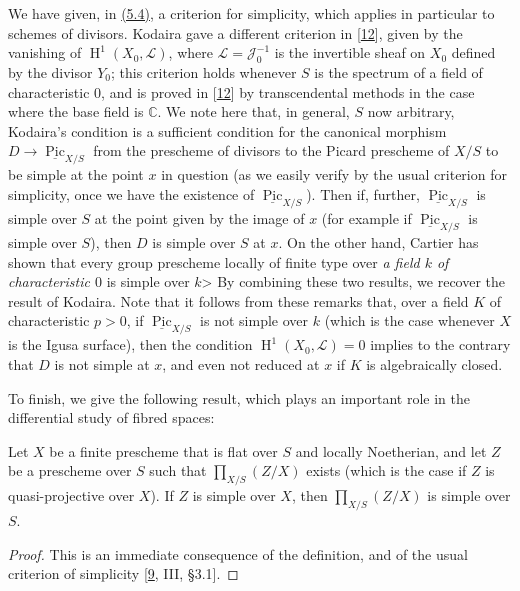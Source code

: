 \documentclass{article}
\theoremstyle{definition}
\theoremstyle{definition}
\theoremstyle{definition}
\theoremstyle{definition}
\theoremstyle{remark}
\begin{document}
\leavevmode{}%
We have given, in \protect\hyperlink{fga-3-iv-remark-5.4}{(5.4)}, a criterion for simplicity, which applies in particular to schemes of divisors.
Kodaira gave a different criterion in {[}\protect\hyperlink{ref-Kod1956}{12}{]}, given by the vanishing of \(\operatorname{H}^1(X_0,{\mathscr{L}})\), where \({\mathscr{L}}={\mathscr{J}}_0^{-1}\) is the invertible sheaf on \(X_0\) defined by the divisor \(Y_0\);
this criterion holds whenever \(S\) is the spectrum of a field of characteristic \(0\), and is proved in {[}\protect\hyperlink{ref-Kod1956}{12}{]} by transcendental methods in the case where the base field is \(\mathbb{C}\).
We note here that, in general, \(S\) now arbitrary, Kodaira's condition is a sufficient condition for the canonical morphism \(D\to\underline{\operatorname{Pic}}_{X/S}\) from the prescheme of divisors to the Picard prescheme of \(X/S\) to be simple at the point \(x\) in question (as we easily verify by the usual criterion for simplicity, once we have the existence of \(\underline{\operatorname{Pic}}_{X/S}\)).
Then if, further, \(\underline{\operatorname{Pic}}_{X/S}\) is simple over \(S\) at the point given by the image of \(x\) (for example if \(\underline{\operatorname{Pic}}_{X/S}\) is simple over \(S\)), then \(D\) is simple over \(S\) at \(x\).
On the other hand, Cartier has shown that every group prescheme locally of finite type over \emph{a field \(k\) of characteristic \(0\)} is simple over \(k\)\textgreater{}
By combining these two results, we recover the result of Kodaira.
Note that it follows from these remarks that, over a field \(K\) of characteristic \(p>0\), if \(\underline{\operatorname{Pic}}_{X/S}\) is not simple over \(k\) (which is the case whenever \(X\) is the Igusa surface), then the condition \(\operatorname{H}^1(X_0,{\mathscr{L}})=0\) implies to the contrary that \(D\) is not simple at \(x\), and even not reduced at \(x\) if \(K\) is algebraically closed.

To finish, we give the following result, which plays an important role in the differential study of fibred spaces:

\leavevmode{}%
Let \(X\) be a finite prescheme that is flat over \(S\) and locally Noetherian, and let \(Z\) be a prescheme over \(S\) such that \(\prod_{X/S}(Z/X)\) exists (which is the case if \(Z\) is quasi-projective over \(X\)).
If \(Z\) is simple over \(X\), then \(\prod_{X/S}(Z/X)\) is simple over \(S\).

\begin{proof}
This is an immediate consequence of the definition, and of the usual criterion of simplicity {[}\protect\hyperlink{ref-Gro1960b}{9}, III, §3.1{]}.
\end{proof}
\end{document}
